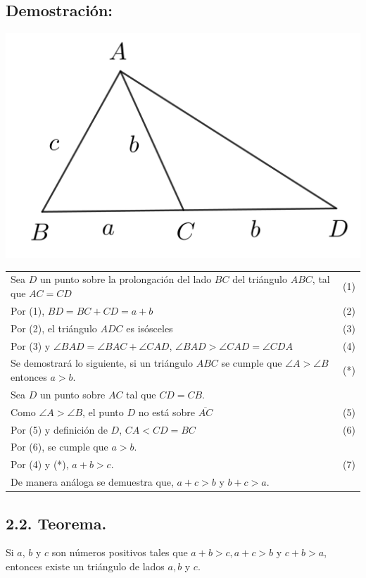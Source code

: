 \documentclass[12pt,a4paper]{article}
\begin{document}
\subsection*{Demostración:}
\begin{center}
\includegraphics[scale=0.7]{Imagenes/demo2.png} 
\end{center}
\begin{tabular}{p{15.9cm} p{1cm}}\\
Sea $D$ un punto sobre la prolongación del lado $BC$ del triángulo $ABC$, tal que $AC=CD$ & (1)
\\Por (1), $BD=BC+CD=a+b$ & (2)
\\Por (2), el triángulo $ADC$ es isósceles & (3) 
\\Por (3) y $\angle BAD =\angle BAC +\angle CAD$, $\angle BAD > \angle CAD = \angle CDA$ &(4)
\\Se  demostrará lo siguiente, si un triángulo $ABC$ se cumple que $\angle A > \angle B$ entonces $a > b$. &(*)
\\Sea $D$ un punto sobre $AC$ tal que $CD=CB$.
\\Como $\angle A > \angle B$, el punto $D$ no está sobre $\overline{AC}$ & (5)
\\Por (5) y definición de $D$, $CA<CD=BC$ &(6)
\\Por (6), se cumple que $a>b$.
\\Por (4) y (*), $a+b>c$. &
(7)
\\De manera análoga se demuestra que, $a+c>b$ y $b+c>a$.
\end{tabular}
\subsection*{2.2. Teorema.}
Si $a$, $b$ y $c$ son números positivos tales que $a+b>c, a+c>b$ y $c+b>a$, entonces existe un triángulo de lados $a, b$ y $c$.\\
\end{document}
